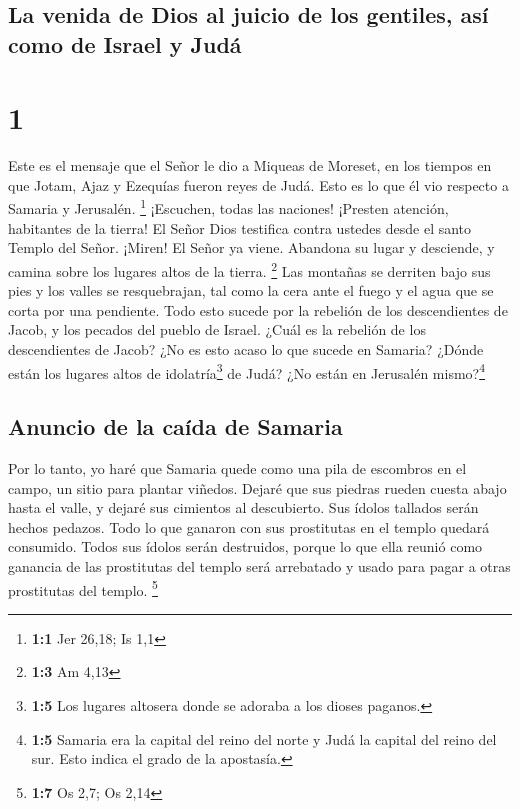 \hypertarget{la-venida-de-dios-al-juicio-de-los-gentiles-asuxed-como-de-israel-y-juduxe1}{%
\subsection{La venida de Dios al juicio de los gentiles, así como de
Israel y
Judá}\label{la-venida-de-dios-al-juicio-de-los-gentiles-asuxed-como-de-israel-y-juduxe1}}

\hypertarget{section}{%
\section{1}\label{section}}

 Este es el mensaje que el Señor le dio a Miqueas de
Moreset, en los tiempos en que Jotam, Ajaz y Ezequías fueron reyes de
Judá. Esto es lo que él vio respecto a Samaria y Jerusalén. \footnote{\textbf{1:1}
  Jer 26,18; Is 1,1}  ¡Escuchen, todas las naciones!
¡Presten atención, habitantes de la tierra! El Señor Dios testifica
contra ustedes desde el santo Templo del Señor.  ¡Miren!
El Señor ya viene. Abandona su lugar y desciende, y camina sobre los
lugares altos de la tierra. \footnote{\textbf{1:3} Am 4,13}
 Las montañas se derriten bajo sus pies y los valles se
resquebrajan, tal como la cera ante el fuego y el agua que se corta por
una pendiente. Todo esto sucede por la rebelión de los descendientes de
Jacob, y los pecados del pueblo de Israel.  ¿Cuál es la
rebelión de los descendientes de Jacob? ¿No es esto acaso lo que sucede
en Samaria? ¿Dónde están los lugares altos de idolatría\footnote{\textbf{1:5}
  Los lugares altosera donde se adoraba a los dioses paganos.} de Judá?
¿No están en Jerusalén mismo?\footnote{\textbf{1:5} Samaria era la
  capital del reino del norte y Judá la capital del reino del sur. Esto
  indica el grado de la apostasía.}

\hypertarget{anuncio-de-la-cauxedda-de-samaria}{%
\subsection{Anuncio de la caída de
Samaria}\label{anuncio-de-la-cauxedda-de-samaria}}

 Por lo tanto, yo haré que Samaria quede como una pila de
escombros en el campo, un sitio para plantar viñedos. Dejaré que sus
piedras rueden cuesta abajo hasta el valle, y dejaré sus cimientos al
descubierto.  Sus ídolos tallados serán hechos pedazos.
Todo lo que ganaron con sus prostitutas en el templo quedará consumido.
Todos sus ídolos serán destruidos, porque lo que ella reunió como
ganancia de las prostitutas del templo será arrebatado y usado para
pagar a otras prostitutas del templo. \footnote{\textbf{1:7} Os 2,7; Os
  2,14}

